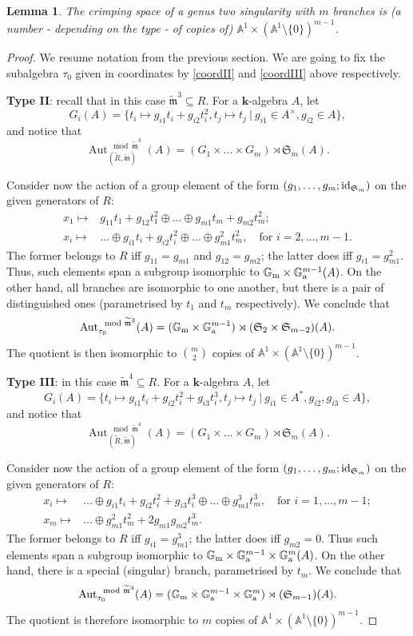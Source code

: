 \documentclass[11pt]{amsart}
\renewcommand{\k}{\mathbf k}
\newcommand{\tR}{\widetilde{R}}
\newcommand{\tm}{\widetilde{\mathfrak m}}
\newcommand{\Aaff}{\mathbb A}
\newcommand{\Gm}{\mathbb{G}_{\rm{m}}}
\newcommand{\Ga}{\mathbb{G}_{\rm{a}}}
\newcommand{\Aut}{\operatorname{Aut}}
\newcommand{\id}{{\rm id}}
\theoremstyle{plain}
\newtheorem{lem}[thm]{Lemma}
\theoremstyle{definition}
\begin{document}
\begin{lem}
 The crimping space of a genus two singularity with $m$ branches is (a number - depending on the type - of copies of) $\Aaff^1\times(\Aaff^1\setminus\{0\})^{m-1}$.
\end{lem}
\begin{proof}
We resume notation from the previous section. We are going to fix the subalgebra $\tau_0$ given in coordinates by \eqref{coordII} and \eqref{coordIII} above respectively.

\textbf{Type II}: recall that in this case $\tm^3\subseteq R$. For a $\k$-algebra $A$, let
\[G_i(A)=\{t_i\mapsto g_{i1}t_i+g_{i2}t_i^2,t_j\mapsto t_j\ |\ g_{i1}\in A^\times,g_{i2}\in A\},\]
and notice that
\[\Aut_{(\tR,\tm)}^{\mod\tm^3}(A)=(G_1\times\ldots\times G_m)\rtimes \mathfrak{S}_m(A).\]

Consider now the action of a group element of the form $(g_1,\ldots,g_m;\id_{\mathfrak{S}_m})$ on the given generators of $R$:
\begin{align*}
 x_1\mapsto& g_{11}t_1+g_{12}t_1^2\oplus\ldots\oplus g_{m1}t_m+g_{m2}t_m^2;\\
 x_i\mapsto& \ldots\oplus g_{i1}t_i+g_{i2}t_i^2\oplus\ldots\oplus g_{m1}^2t_m^2,\quad\text{for } i=2,\ldots,m-1.
\end{align*}
The former belongs to $R$ iff $g_{11}=g_{m1}$ and $g_{12}=g_{m2}$; the latter does iff $g_{i1}=g_{m1}^2$. Thus, such elements span a subgroup isomorphic to $\Gm\times\Ga^{m-1}(A)$. On the other hand, all branches are isomorphic to one another, but there is a pair of distinguished ones (parametrised by $t_1$ and $t_m$ respectively). We conclude that
\[\Aut_{\tau_0}^{\mod\tm^3}(A)=(\Gm\times\Ga^{m-1})\rtimes(\mathfrak{S}_2\times\mathfrak{S}_{m-2})(A).\]
The quotient is then isomorphic to $\binom{m}{2}$ copies of $\Aaff^1\times(\Aaff^1\setminus\{0\})^{m-1}$.

\textbf{Type III}: in this case $\tm^4\subseteq R$. For a $\k$-algebra $A$, let
\[G_i(A)=\{t_i\mapsto g_{i1}t_i+g_{i2}t_i^2+g_{i3}t_i^3,t_j\mapsto t_j\ |\ g_{i1}\in A^*,g_{i2},g_{i3}\in A\},\]
and notice that
\[\Aut_{(\tR,\tm)}^{\mod\tm^4}(A)=(G_1\times\ldots\times G_m)\rtimes \mathfrak{S}_m(A).\]

Consider now the action of a group element of the form $(g_1,\ldots,g_m;\id_{\mathfrak{S}_m})$ on the given generators of $R$:
\begin{align*}
 x_i\mapsto& \ldots\oplus g_{i1}t_i+g_{i2}t_i^2+g_{i3}t_i^3\oplus\ldots\oplus g_{m1}^3t_m^3,\quad\text{for } i=1,\ldots,m-1;\\
 x_m\mapsto& \ldots\oplus g_{m1}^2t_m^2+2g_{m1}g_{m2}t_m^3.
\end{align*}
The former belongs to $R$ iff $g_{i1}=g_{m1}^3$; the latter does iff $g_{m2}=0$. Thus such elements span a subgroup isomorphic to $\Gm\times\Ga^{m-1}\times\Ga^m(A)$. On the other hand, there is a special (singular) branch, parametrised by $t_m$. We conclude that
\[\Aut_{\tau_0}^{\mod\tm^3}(A)=(\Gm\times\Ga^{m-1}\times\Ga^m)\rtimes(\mathfrak{S}_{m-1})(A).\]
The quotient is therefore isomorphic to $m$ copies of $\Aaff^1\times(\Aaff^1\setminus\{0\})^{m-1}$. 
\end{proof}
\end{document}
